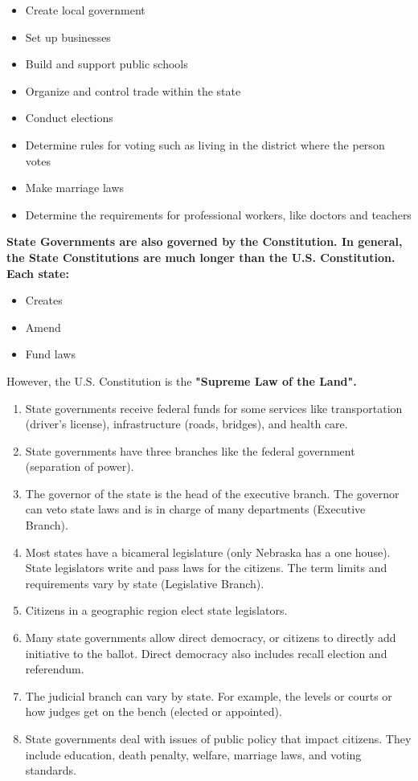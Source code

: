 \begin{itemize}
    \item Create local government
    \item Set up businesses
    \item Build and support public schools
    \item Organize and control trade within the state
    \item Conduct elections
    \item Determine rules for voting such as living in the district where the person votes
    \item Make marriage laws
    \item Determine the requirements for professional workers, like doctors and teachers
\end{itemize}

\bf{State Governments} are also governed by the Constitution. In general, the \bf{State Constitutions} are much longer than the U.S. Constitution. Each state:

\begin{itemize}
    \item Creates
    \item Amend
    \item Fund laws
\end{itemize}

However, the U.S. Constitution is the \bf{"Supreme Law of the Land"}. 

\begin{enumerate}
    \item State governments receive federal funds for some services like transportation (driver's license), infrastructure (roads, bridges), and health care.
    \item State governments have three branches like the federal government (separation of power).
    \item The governor of the state is the head of the executive branch. The governor can veto state laws and is in charge of many departments (Executive Branch).
    \item Most states have a bicameral legislature (only Nebraska has a one house). State legislators write and pass laws for the citizens. The term limits and requirements vary by state (Legislative Branch).
    \item Citizens in a geographic region elect state legislators.
    \item Many state governments allow direct democracy, or citizens to directly add initiative to the ballot. Direct democracy also includes recall election and referendum.
    \item The judicial branch can vary by state. For example, the levels or courts or how judges get on the bench (elected or appointed).
    \item State governments deal with issues of public policy that impact citizens. They include education, death penalty, welfare, marriage laws, and voting standards.
\end{enumerate}

